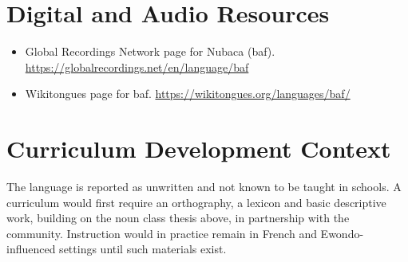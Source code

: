 \documentclass[12pt]{article}
\begin{document}
\section{Digital and Audio Resources}
\begin{itemize}
\item Global Recordings Network page for Nubaca (baf). \url{https://globalrecordings.net/en/language/baf}
\item Wikitongues page for baf. \url{https://wikitongues.org/languages/baf/}
\end{itemize}

\section{Curriculum Development Context}
The language is reported as unwritten and not known to be taught in schools. A curriculum would first require an orthography, a lexicon and basic descriptive work, building on the noun class thesis above, in partnership with the community. Instruction would in practice remain in French and Ewondo-influenced settings until such materials exist.
\end{document}
